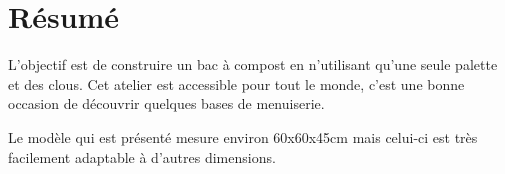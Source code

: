 \section{Résumé}

L'objectif est de construire un bac à compost en n'utilisant qu'une seule palette et des clous.
Cet atelier est accessible pour tout le monde, c'est une bonne occasion de découvrir quelques bases de menuiserie.

Le modèle qui est présenté mesure environ 60x60x45cm mais celui-ci est très facilement adaptable à d'autres dimensions.